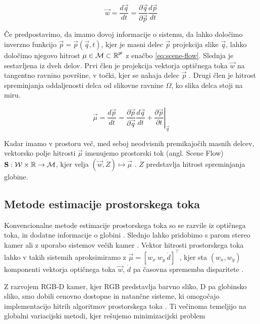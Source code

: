 \begin{equation}\label{eq:opticni-tok-sf}
	\vec{w} = \frac{d\vec{q}}{dt} = \frac{\partial \vec{q}}{\partial \vec{p}}\frac{d\vec{p}}{dt}
\end{equation}

Če predpostavimo, da imamo dovoj informacije o sistemu, da lahko določimo inverzno funkcijo $\vec{p} = \vec{p}(\vec{q},t)$, kjer je masni delec $\vec{p}$ projekcija slike $\vec{q}$, lahko določimo njegovo hitrost $\mathbf{\mu} \in \mathcal{M} \subset \mathbb{R^3}$ z enačbo \eqref{eq:scene-flow}. Slednja je sestavljena iz dveh delov. Prvi člen je projekcija vektorja optičnega toka $\vec{w}$ na tangentno ravnino površine, v točki, kjer se nahaja delec $\vec{p}$ \cite{vedula1999three}. Drugi člen je hitrost spreminjanja oddaljenosti delca od slikovne ravnine $\mathit{\Omega}$, ko slika delca stoji na miru. 

\begin{equation}\label{eq:scene-flow}
	\vec{\mu} = \frac{d\vec{p}}{dt} = \frac{\partial \vec{p}}{\partial \vec{q}} \frac{d\vec{q}}{dt} + \left.\frac{\partial \vec{p}}{\partial t}\right|_\vec{q}
\end{equation}

Kadar imamo v prostoru več, med seboj neodvisnih premikajočih masnih delcev, vektorsko polje hitrosti $\vec{\mu}$ imenujemo prostorski tok (angl. Scene Flow) $\mathbf{S}: \mathcal{W} \times \mathbb{R} \to \mathcal{M}$, kjer velja $(\vec{w}, \dot{Z}) \mapsto \vec{\mu}$ \cite{yan2016scene}. $\dot{Z}$ predstavlja hitrost spreminjanja globine.

\subsection{Metode estimacije prostorskega toka}
Konvencionalne metode estimacije prostorskega toka so se razvile iz optičnega toka, in dodatne informacije o globini \cite{yan2016scene}. Slednjo lahko pridobimo s parom stereo kamer ali z uporabo sistemov večih kamer \cite{jaimez2015primal}. Vektor hitrosti prostorskega toka lahko v takih sistemih aproksimiramo z $\vec{\mu} = \left[w_x~w_y~\dot{d}\right]^\top$, kjer sta $(w_x, w_y)$ komponenti vektorja optičnega toka $\vec{w}$, $\dot{d}$ pa časovna sprememba disparitete \cite{yan2016scene}.

Z razvojem RGB-D kamer, kjer RGB predstavlja barvno sliko, D pa globinsko sliko, smo dobili cenovno dostopne in natančne sisteme, ki omogočajo implementacijo hitrih algoritmov prostorskega toka \cite{yan2016scene,jaimez2015primal}. Ti večinoma temeljijo na globalni variacijski metodi, kjer rešujemo minimizacijski problem 

